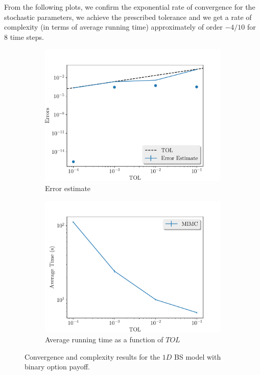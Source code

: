 \documentclass[11pt]{article}
\begin{document}
From the following plots, we confirm the exponential rate of convergence for the stochastic parameters, we achieve the prescribed tolerance and  we get a rate of complexity (in terms of average running time) approximately of order $-4/10$ for $8$ time steps.
\begin{figure}[!h]
	\centering
	\begin{subfigure}{.5\textwidth}
		\centering
		\includegraphics[width=1\linewidth]{./figures/binary_8_steps/error_estimate.pdf}
		\caption{Error estimate}
		\label{fig:misc_binary_8_steps_sub1}
	\end{subfigure}%
	\begin{subfigure}{.5\textwidth}
		\centering
		\includegraphics[width=1\linewidth]{./figures/binary_8_steps/average_running_time.pdf}
		\caption{Average running time as a function of $TOL$}
		\label{fig:misc_binary_8_steps_sub2}
	\end{subfigure}%
	\caption{Convergence and complexity results for the $1D$ BS model with binary option payoff.}
	\label{fig:misc_binary_8_steps_2}
\end{figure}
\end{document}
